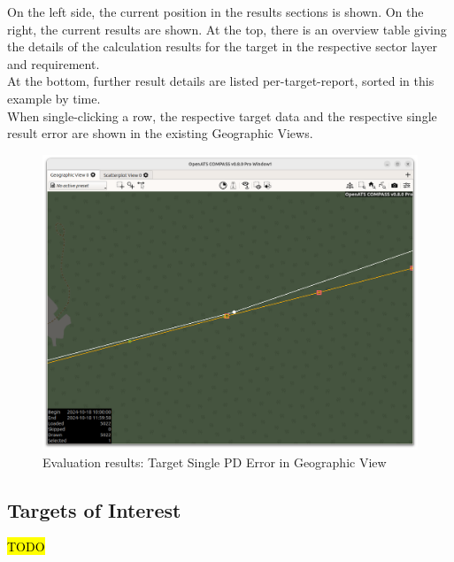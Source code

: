 On the left side, the current position in the results sections is shown. On the right, the current results are shown. At the top, there is an overview table giving the details of the calculation results for the target in the respective sector layer and requirement. \\

At the bottom, further result details are listed per-target-report, sorted in this example by time. \\

When single-clicking a row, the respective target data and the respective single result error are shown in the existing Geographic Views.

\begin{figure}[H]
  \hspace*{-2.5cm}
    \includegraphics[width=19cm]{figures/eval_results_pd_single_tr_geoview.png}
  \caption{Evaluation results: Target Single PD Error in Geographic View}
\end{figure}

\subsection{Targets of Interest}
\label{sec:eval_targets_of_interest}

\hl{TODO}
